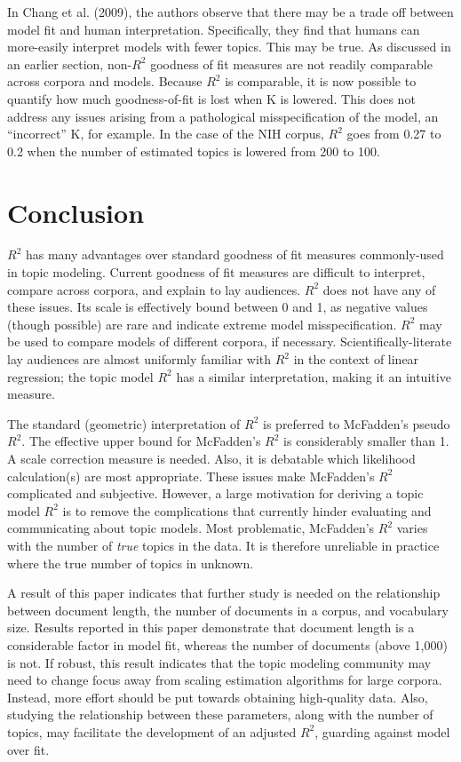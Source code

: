 \documentclass[conference,final,]{IEEEtran}
\begin{document}
In Chang et al. (2009), the authors observe that there may be a trade
off between model fit and human interpretation. Specifically, they find
that humans can more-easily interpret models with fewer topics. This may
be true. As discussed in an earlier section, non-\(R^2\) goodness of fit
measures are not readily comparable across corpora and models. Because
\(R^2\) is comparable, it is now possible to quantify how much
goodness-of-fit is lost when K is lowered. This does not address any
issues arising from a pathological misspecification of the model, an
``incorrect'' K, for example. In the case of the NIH corpus, \(R^2\)
goes from 0.27 to 0.2 when the number of estimated topics is lowered
from 200 to 100.

\hypertarget{conclusion}{%
\section{Conclusion}\label{conclusion}}

\(R^2\) has many advantages over standard goodness of fit measures
commonly-used in topic modeling. Current goodness of fit measures are
difficult to interpret, compare across corpora, and explain to lay
audiences. \(R^2\) does not have any of these issues. Its scale is
effectively bound between 0 and 1, as negative values (though possible)
are rare and indicate extreme model misspecification. \(R^2\) may be
used to compare models of different corpora, if necessary.
Scientifically-literate lay audiences are almost uniformly familiar with
\(R^2\) in the context of linear regression; the topic model \(R^2\) has
a similar interpretation, making it an intuitive measure.

The standard (geometric) interpretation of \(R^2\) is preferred to
McFadden's pseudo \(R^2\). The effective upper bound for McFadden's
\(R^2\) is considerably smaller than 1. A scale correction measure is
needed. Also, it is debatable which likelihood calculation(s) are most
appropriate. These issues make McFadden's \(R^2\) complicated and
subjective. However, a large motivation for deriving a topic model
\(R^2\) is to remove the complications that currently hinder evaluating
and communicating about topic models. Most problematic, McFadden's
\(R^2\) varies with the number of \textit{true} topics in the data. It
is therefore unreliable in practice where the true number of topics in
unknown.

A result of this paper indicates that further study is needed on the
relationship between document length, the number of documents in a
corpus, and vocabulary size. Results reported in this paper demonstrate
that document length is a considerable factor in model fit, whereas the
number of documents (above 1,000) is not. If robust, this result
indicates that the topic modeling community may need to change focus
away from scaling estimation algorithms for large corpora. Instead, more
effort should be put towards obtaining high-quality data. Also, studying
the relationship between these parameters, along with the number of
topics, may facilitate the development of an adjusted \(R^2\), guarding
against model over fit.
\end{document}
